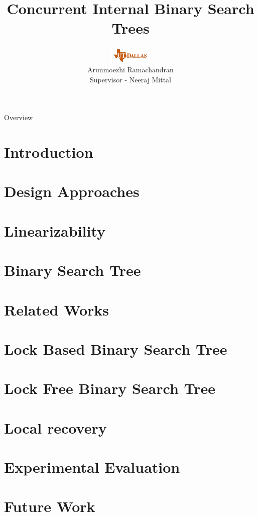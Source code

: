 \documentclass{beamer}
\title{Concurrent Internal Binary Search Trees}
\author[Arun]{\includegraphics[height=0.8cm]{figures/utd_logo.jpg}\\
Arunmoezhi Ramachandran \\
Supervisor - Neeraj Mittal\\
}
\institute[UTDallas]{The University of Texas at Dallas}
\date{}
\begin{document}
\begin{frame}
	\titlepage
\end{frame}

		
\begin{frame}{Overview}
	\tableofcontents
\end{frame}
\section{Introduction}


\section{Design Approaches}


\section{Linearizability}


\section{Binary Search Tree}


\section{Related Works}


\section{Lock Based Binary Search Tree}


\section{Lock Free Binary Search Tree}

\section{Local recovery}


\section{Experimental Evaluation}


\section{Future Work}

\end{document}
